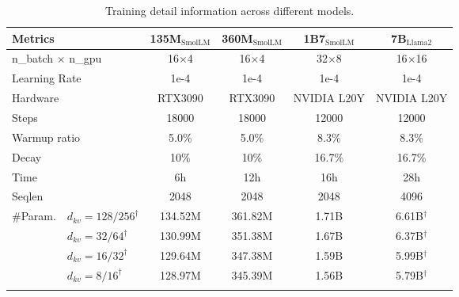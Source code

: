 \begin{table*}[t]
\centering
\small
\setlength\tabcolsep{3pt}
\begin{tabular}{l@{}lcccc}
  \toprule
  \multicolumn{2}{l}{\textbf{Metrics}} & \textbf{135M$_{\text{SmolLM}}$} & \textbf{360M$_{\text{SmolLM}}$} & \textbf{1B7$_{\text{SmolLM}}$} & \textbf{7B$_{\text{Llama2}}$} \\
  \midrule
  \multicolumn{2}{l}{n\_batch $\times$ n\_gpu} & 16$\times$4 & 16$\times$4 & 32$\times$8 & 16$\times$16 \\
  \multicolumn{2}{l}{Learning Rate} & 1e-4 & 1e-4 & 1e-4 & 1e-4 \\
  \multicolumn{2}{l}{Hardware} & RTX3090 & RTX3090 & NVIDIA L20Y & NVIDIA L20Y \\
  \multicolumn{2}{l}{Steps} & 18000 & 18000 & 12000 & 12000 \\
  \multicolumn{2}{l}{Warmup ratio} & 5.0\% & 5.0\% & 8.3\% & 8.3\% \\
  \multicolumn{2}{l}{Decay} & 10\% & 10\% & 16.7\% & 16.7\% \\
  \multicolumn{2}{l}{Time} & 6h & 12h & 16h & 28h \\
  \multicolumn{2}{l}{Seqlen} & 2048 & 2048 & 2048 & 4096 \\
  \multirow{4}{*}{\#Param.} & $d_{kv}\!=\!128/256^\dag$ & 134.52M & 361.82M & 1.71B & 6.61B$^\dag$ \\
  & $d_{kv}\!=\!32/64^\dag$  & 130.99M & 351.38M & 1.67B & 6.37B$^\dag$ \\
  & $d_{kv}\!=\!16/32^\dag$  & 129.64M & 347.38M & 1.59B & 5.99B$^\dag$ \\
  & $d_{kv}\!=\!8/16^\dag$   & 128.97M & 345.39M & 1.56B & 5.79B$^\dag$ \\
  \arrayrulecolor{black}
  \bottomrule
\end{tabular}
\caption{Training detail information across different models.}
\label{tab:Hyperparameters}
\end{table*}




